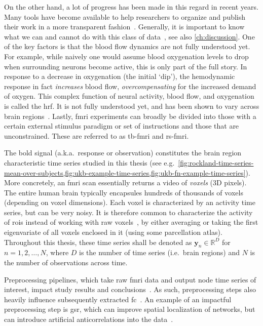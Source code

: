 On the other hand, a lot of progress has been made in this regard in recent years.
Many tools have become available to help researchers to organize and publish their work in a more transparent fashion~\parencite{Marcus2011, Kumar2022, Niso2022}.
Generally, it is important to know what we can and cannot do with this class of data~\parencite{Logothetis2008}, see also \cref{ch:discussion}.
%
One of the key factors is that the blood flow dynamics are not fully understood yet.
For example, while naively one would assume blood oxygenation levels to drop when surrounding neurons become active, this is only part of the full story.
In response to a decrease in oxygenation (the initial `dip'), the hemodynamic response in fact \emph{increases} blood flow, \emph{overcompensating} for the increased demand of oxygen.
This complex function of neural activity, blood flow, and oxygenation is called the \gls{hrf}.
It is not fully understood yet, and has been shown to vary across brain regions~\parencite{Handwerker2004}.
%
Lastly, \gls{fmri} experiments can broadly be divided into those with a certain external stimulus paradigm or set of instructions and those that are unconstrained.
These are referred to as \gls{tb-fmri} and \gls{rs-fmri}.

The \gls{bold} signal (a.k.a.~response or observation) constitutes the brain region characteristic time series studied in this thesis (see e.g.~\cref{fig:rockland-time-series-mean-over-subjects,fig:ukb-example-time-series,fig:ukb-fn-example-time-series}).
More concretely, an \gls{fmri} scan essentially returns a video of \emph{voxels} (3D pixels).
The entire human brain typically encapsules hundreds of thousands of voxels (depending on voxel dimensions).
Each voxel is characterized by an activity time series, but can be very noisy.
It is therefore common to characterize the activity of \glspl{roi} instead of working with raw voxels~\parencite{Korhonen2017}, by either averaging or taking the first eigenvariate of all voxels enclosed in it (using some parcellation atlas).
Throughout this thesis, these time series shall be denoted as $\mathbf{y}_n \in \mathbb{R}^D$ for $n = 1, 2, \ldots , N$, where $D$ is the number of time series (i.e.~brain regions) and $N$ is the number of observations across time.

Preprocessing pipelines, which take raw \gls{fmri} data and output node time series of interest, impact study results and conclusions~\parencite{Caballero-Gaudes2017}.
As such, preprocessing steps also heavily influence subsequently extracted \gls{fc}~\parencite{Aquino2022}.
An example of an impactful preprocessing step is \gls{gsr}, which can improve spatial localization of networks, but can introduce artificial anticorrelations into the data~\parencite{Murphy2009}.

